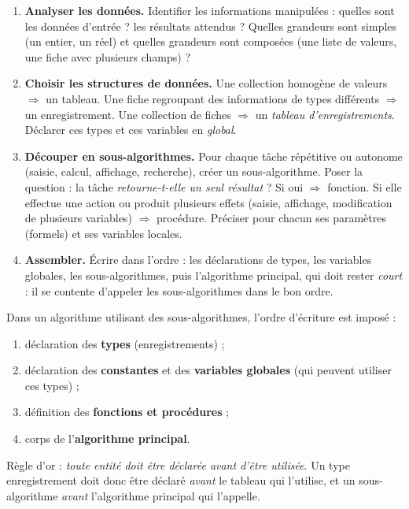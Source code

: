 \documentclass[11pt]{article}
\newcommand{\cle}[1]{{\popxbold\color{popdark}#1}}
\begin{document}
\begin{methode}
\begin{enumerate}
\item \textbf{Analyser les données.} Identifier les informations manipulées : quelles sont les données d'entrée ? les résultats attendus ? Quelles grandeurs sont simples (un entier, un réel) et quelles grandeurs sont composées (une liste de valeurs, une fiche avec plusieurs champs) ?
\item \textbf{Choisir les structures de données.} Une collection homogène de valeurs $\Rightarrow$ un \cle{tableau}. Une fiche regroupant des informations de types différents $\Rightarrow$ un \cle{enregistrement}. Une collection de fiches $\Rightarrow$ un \emph{tableau d'enregistrements}. Déclarer ces types et ces variables en \emph{global}.
\item \textbf{Découper en sous-algorithmes.} Pour chaque tâche répétitive ou autonome (saisie, calcul, affichage, recherche), créer un sous-algorithme. Poser la question : la tâche \emph{retourne-t-elle un seul résultat} ? Si oui $\Rightarrow$ \cle{fonction}. Si elle effectue une action ou produit plusieurs effets (saisie, affichage, modification de plusieurs variables) $\Rightarrow$ \cle{procédure}. Préciser pour chacun ses paramètres (formels) et ses variables locales.
\item \textbf{Assembler.} Écrire dans l'ordre : les déclarations de types, les variables globales, les sous-algorithmes, puis l'algorithme principal, qui doit rester \emph{court} : il se contente d'appeler les sous-algorithmes dans le bon ordre.
\end{enumerate}
\end{methode}

\begin{propriete}
Dans un algorithme utilisant des sous-algorithmes, l'ordre d'écriture est imposé :
\begin{enumerate}
\item déclaration des \textbf{types} (enregistrements) ;
\item déclaration des \textbf{constantes} et des \textbf{variables globales} (qui peuvent utiliser ces types) ;
\item définition des \textbf{fonctions et procédures} ;
\item corps de l'\textbf{algorithme principal}.
\end{enumerate}
Règle d'or : \emph{toute entité doit être déclarée avant d'être utilisée}. Un type enregistrement doit donc être déclaré \emph{avant} le tableau qui l'utilise, et un sous-algorithme \emph{avant} l'algorithme principal qui l'appelle.
\end{propriete}
\end{document}
